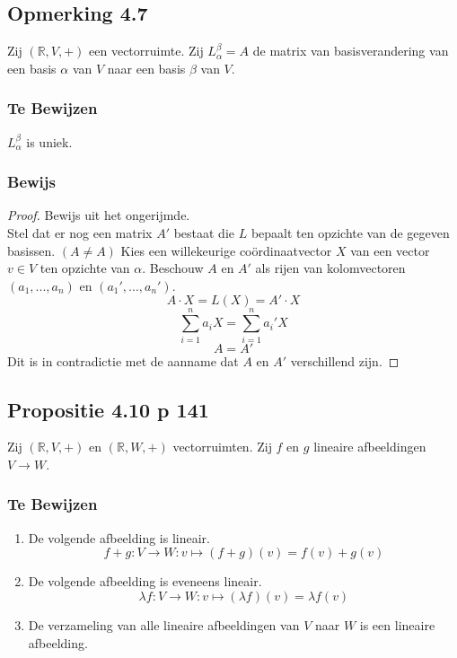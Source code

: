 \documentclass[lineaire_algebra_oplossingen.tex]{subfiles}
\begin{document}
\subsection{Opmerking 4.7}
Zij $(\mathbb{R},V,+)$ een vectorruimte.
Zij $L_{\alpha}^{\beta} = A$ de matrix van basisverandering van een basis $\alpha$ van $V$ naar een basis $\beta$ van $V$.

\subsubsection*{Te Bewijzen}
$L_{\alpha}^{\beta}$ is uniek.

\subsubsection*{Bewijs}
\begin{proof}
Bewijs uit het ongerijmde.\\
Stel dat er nog een matrix $A'$ bestaat die $L$ bepaalt ten opzichte van de gegeven basissen. $(A\neq A)$
Kies een willekeurige co\"ordinaatvector $X$ van een vector $v\in V$ ten opzichte van $\alpha$. Beschouw $A$ en $A'$ als rijen van kolomvectoren $(a_1,...,a_n)$ en $(a_1',...,a_n')$.
\[
A \cdot X = L(X) = A'\cdot X
\]
\[
\sum_{i=1}^na_iX = \sum_{i=1}^na_i'X
\]
\[
A=A'
\]
Dit is in contradictie met de aanname dat $A$ en $A'$ verschillend zijn.
\end{proof}


\subsection{Propositie 4.10 p 141}
Zij $(\mathbb{R},V,+)$ en $(\mathbb{R},W,+)$ vectorruimten. Zij $f$ en $g$ lineaire afbeeldingen $V\rightarrow W$.
\subsubsection*{Te Bewijzen}
\begin{enumerate}
\item De volgende afbeelding is lineair.
\[f+g: V \rightarrow W: v\mapsto(f+g)(v)=f(v)+g(v)\]

\item De volgende afbeelding is eveneens lineair.
\[\lambda f: V\rightarrow W: v\mapsto (\lambda f)(v) = \lambda f(v)\]

\item De verzameling van alle lineaire afbeeldingen van $V$ naar $W$ is een lineaire afbeelding.

\end{enumerate}
\end{document}
